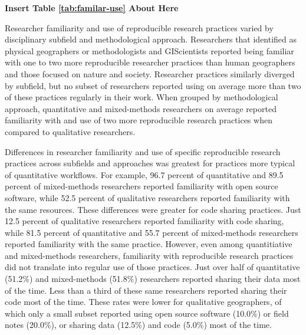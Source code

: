 \documentclass[]{interact}
\theoremstyle{plain}%
\theoremstyle{definition}
\theoremstyle{remark}
\begin{document}
\begin{center}
\textbf{Insert Table \ref{tab:familar-use} About Here}
\end{center}

Researcher familiarity and use of reproducible research practices varied by disciplinary subfield and methodological approach. 
Researchers that identified as physical geographers or methodologists and GIScientists reported being familiar with one to two more reproducible researcher practices than human geographers and those focused on nature and society.
Researcher practices similarly diverged by subfield, but no subset of researchers reported using on average more than two of these practices regularly in their work.  
When grouped by methodological approach, quantitative and mixed-methods researchers on average reported familiarity with and use of two more reproducible research practices when compared to qualitative researchers.

Differences in researcher familiarity and use of specific reproducible research practices across subfields and approaches was greatest for practices more typical of quantitative workflows. 
For example, 96.7 percent of quantitative and 89.5 percent of mixed-methods researchers reported familiarity with open source software, while 52.5 percent of qualitative researchers reported familiarity with the same resources.
These differences were greater for code sharing practices. 
Just 12.5 percent of qualitative researchers reported familiarity with code sharing, while 81.5 percent of quantitative and 55.7 percent of mixed-methods researchers reported familiarity with the same practice.
However, even among quantitiative and mixed-methods researchers, familiarity with reproducible research practices did not translate into regular use of those practices.
Just over half of quantitative (51.2\%) and mixed-methods (51.8\%) researchers reported sharing their data most of the time.
Less than a third of these same researchers reported sharing their code most of the time. 
These rates were lower for qualitative geographers, of which only a small subset reported using open source software (10.0\%) or field notes (20.0\%), or sharing data (12.5\%) and code (5.0\%) most of the time.
\end{document}
